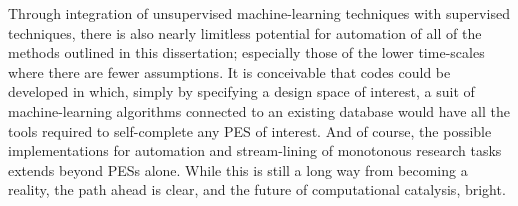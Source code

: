 \documentclass[12pt]{cmuthesis}
\begin{document}
Through integration of unsupervised machine-learning techniques with supervised techniques, there is also nearly limitless potential for automation of all of the methods outlined in this dissertation; especially those of the lower time-scales where there are fewer assumptions. It is conceivable that codes could be developed in which, simply by specifying a design space of interest, a suit of machine-learning algorithms connected to an existing database would have all the tools required to self-complete any PES of interest. And of course, the possible implementations for automation and stream-lining of monotonous research tasks extends beyond PESs alone. While this is still a long way from becoming a reality, the path ahead is clear, and the future of computational catalysis, bright.



\end{document}

